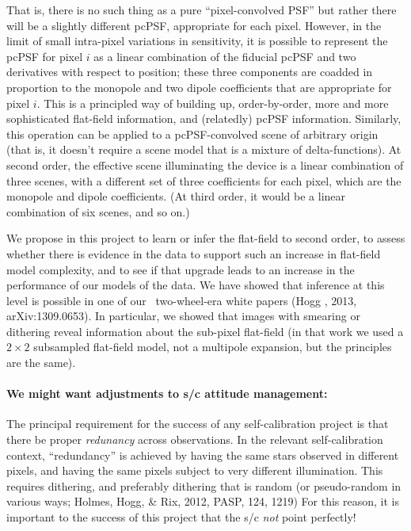 \documentclass[12pt,preprint]{aastex}
\begin{document}
That is, there is no such thing as a pure ``pixel-convolved PSF'' but
rather there will be a slightly different pcPSF,
appropriate for each pixel.
However, in the limit of small intra-pixel variations in sensitivity,
it is possible to represent the pcPSF for pixel $i$ as a
linear combination of the fiducial pcPSF and two
derivatives with respect to position; these three components are
coadded in proportion to the monopole and two dipole coefficients
that are appropriate for pixel $i$.
This is a principled way of building up, order-by-order, more and more
sophisticated flat-field information, and (relatedly) pcPSF
information.
Similarly, this operation can be applied to a pcPSF-convolved scene of
arbitrary origin (that is, it doesn't require a scene model that is
a mixture of delta-functions).
At second order, the effective scene illuminating the device is a
linear combination of three scenes, with a different set of three
coefficients for each pixel, which are the monopole and dipole
coefficients.
(At third order, it would be a linear combination of six scenes, and
so on.)

We propose in this project to learn or infer the flat-field to second
order, to assess whether there is evidence in the data to support such
an increase in flat-field model complexity, and to see if that upgrade
leads to an increase in the performance of our models of the data.
We have showed that inference at this level is possible in one of our
\kepler\ two-wheel-era white papers (Hogg \etal, 2013, arXiv:1309.0653).
In particular, we showed that images with smearing or dithering reveal
information about the sub-pixel flat-field (in that work we used a
$2\times 2$ subsampled flat-field model, not a multipole expansion,
but the principles are the same).

\paragraph{We might want adjustments to s/c attitude management:}

The principal requirement for the success of any self-calibration project
is that there be proper \emph{redunancy} across observations.
In the relevant self-calibration context, ``redundancy'' is achieved
by having the same stars observed in different pixels, and having the
same pixels subject to very different illumination.
This requires dithering, and preferably dithering that is random (or
pseudo-random in various ways; Holmes, Hogg, \& Rix, 2012, PASP, 124,
1219)
For this reason, it is important to the success of this project that
the s/c \emph{not} point perfectly!
\end{document}

